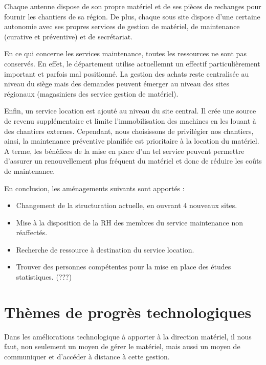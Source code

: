 Chaque antenne dispose de son propre matériel et de ses pièces de rechanges pour fournir les chantiers de sa région.
De plus, chaque sous site dispose d’une certaine autonomie avec ses propres services de gestion de matériel, de maintenance (curative et préventive) et de secrétariat. 


En ce qui concerne les services maintenance, toutes les ressources ne sont pas conservés. En effet, le département
utilise actuellemnt un effectif particulièrement important et parfois mal positionné. 
La gestion des achats reste centralisée au niveau du siège mais des demandes peuvent émerger au niveau des sites régionaux (magasiniers des service gestion de matériel).


Enfin, un service location est ajouté au niveau du site central. Il crée une source de revenu supplémentaire et limite l’immobilisation des machines en les louant à des chantiers externes. Cependant, nous choisissons de privilégier nos chantiers, ainsi, la maintenance préventive planifiée est prioritaire à la location du matériel. A terme, les bénéfices de la mise en place d’un tel service peuvent permettre d’assurer un renouvellement plus fréquent du matériel et donc de réduire les coûts de maintenance.


En conclusion, les aménagements suivants sont apportés :
        \begin{itemize}
                \item Changement de la structuration actuelle, en ouvrant 4 nouveaux sites.
                \item Mise à la disposition de la RH des membres du service maintenance non réaffectés.
                \item Recherche de ressource à destination du service location.
                \item Trouver des personnes compétentes pour la mise en place des études statistiques. (???)
        \end{itemize} 

		

\section{Thèmes de progrès technologiques}

Dans les améliorations technologique à apporter à la direction matériel, il nous faut, non seulement un moyen de gérer le matériel, mais aussi un moyen de communiquer et d'accéder à distance à cette gestion.


